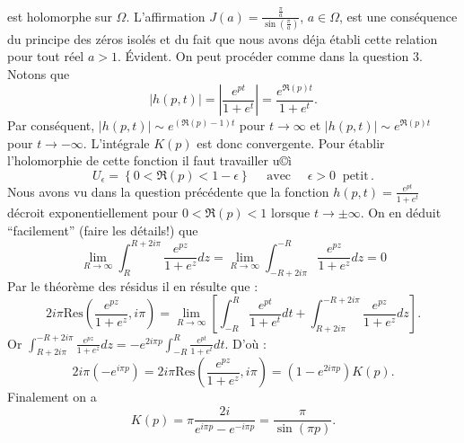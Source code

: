 {\begin{enumerate}
{est holomorphe sur $\Omega$.
L'affirmation $J(a)= \frac{\frac{\pi}{a}}{\sin\left(\frac{\pi}{a}\right)}$, $a\in \Omega$, est une cons\'equence
du principe des z\'eros isol\'es et du fait que nous avons d\'eja \'etabli cette relation pour tout r\'eel $a>1$.
\'Evident.
On peut proc\'eder comme dans la question 3. Notons que
$$|h(p,t)| =\left| \frac{e^{pt}}{1+e^t}\right|=\frac{e^{\Re (p) t}}{1+e^t}.$$
Par cons\'equent, $|h(p,t) | \sim e^{(\Re (p) -1)t}$ pour $t\to\infty$ et
$|h(p,t) | \sim e^{\Re (p) t}$ pour $t\to -\infty$. L'int\'egrale $K(p)$
est donc convergente. Pour \'etablir l'holomorphie de cette fonction il faut travailler
u©ì$$U_\epsilon =\left\{ 0< \Re (p) < 1-\epsilon \right\} \quad\text{ avec } \quad \epsilon >0 \; \; \text{petit}\, .$$
Nous avons vu dans la question pr\'ec\'edente que la fonction $h(p,t)=\frac{e^{pt}}{1+e^t}$
d\'ecroit exponentiellement pour $0< \Re (p) < 1$ lorsque $t\to \pm \infty$. On en d\'eduit
``facilement'' (faire les d\'etails!) que
$$\lim_{R\to\infty }\int_R^{R+2i\pi}\frac{e^{pz}}{1+e^z}dz = \lim_{R\to\infty }\int_{-R+2i\pi}^{-R}\frac{e^{pz}}{1+e^z}dz =0$$
Par le th\'eor\`eme des r\'esidus il en r\'esulte que :
$$2i\pi \mathrm{Res} \left(\frac{e^{pz}}{1+e^z} , i\pi \right)= \lim_{R\to\infty}
\left[ \int_{-R}^{R}\frac{e^{pt}}{1+e^t}dt+ \int_{R+2i\pi}^{-R+2i\pi}\frac{e^{pz}}{1+e^z}dz\right].$$
Or $\int_{R+2i\pi}^{-R+2i\pi}\frac{e^{pz}}{1+e^z}dz= -e^{2i\pi p}\int_{-R}^{R}\frac{e^{pt}}{1+e^t}dt$.
D'o\`u :
$$2i\pi \left( -e^{i\pi p }\right) = 2i\pi \mathrm{Res} \left(\frac{e^{pz}}{1+e^z} , i\pi \right)
=\left( 1-e^{2i\pi p}\right) K(p).$$
Finalement on a
$$K(p)=\pi \frac{2i}{e^{i\pi p}-e^{-i\pi p}} =\frac{\pi}{\sin (\pi p)}.$$
}
\end{enumerate}
}
